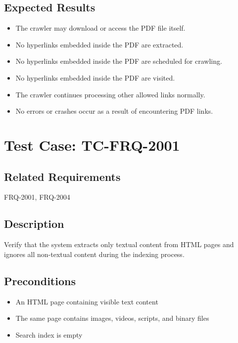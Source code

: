 \documentclass{article}
\begin{document}
\subsection*{Expected Results}
\begin{itemize}
  \item The crawler may download or access the PDF file itself.
  \item No hyperlinks embedded inside the PDF are extracted.
  \item No hyperlinks embedded inside the PDF are scheduled for crawling.
  \item No hyperlinks embedded inside the PDF are visited.
  \item The crawler continues processing other allowed links normally.
  \item No errors or crashes occur as a result of encountering PDF links.
\end{itemize}


\section{Test Case: TC-FRQ-2001}

\subsection*{Related Requirements}
FRQ-2001, FRQ-2004

\subsection*{Description}
Verify that the system extracts only textual content from HTML pages and ignores
all non-textual content during the indexing process.

\subsection*{Preconditions}
\begin{itemize}
  \item An HTML page containing visible text content
  \item The same page contains images, videos, scripts, and binary files
  \item Search index is empty
\end{itemize}
\end{document}
